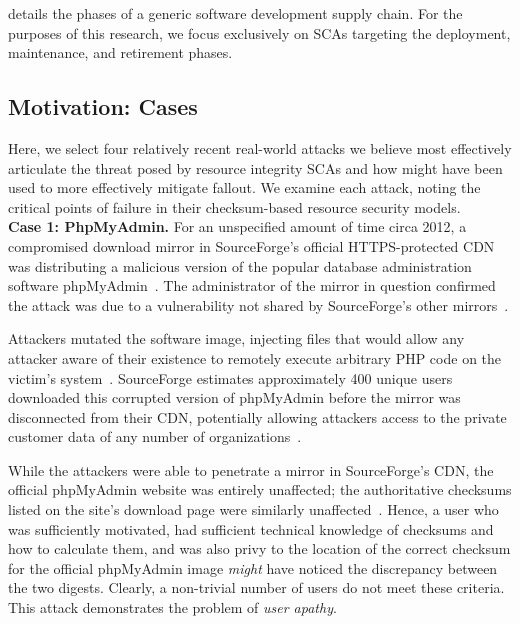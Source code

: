  details the phases of a generic software development supply
chain. For the purposes of this research, we focus exclusively on SCAs targeting
the deployment, maintenance, and retirement phases.

\subsection{Motivation: Cases}

Here, we select four relatively recent real-world attacks we believe most
effectively articulate the threat posed by resource integrity SCAs and how
\SYSTEM{} might have been used to more effectively mitigate fallout. We examine
each attack, noting the critical points of failure in their checksum-based
resource security models. \\

\noindent\textbf{Case 1: PhpMyAdmin.} For an unspecified amount of time circa
2012, a compromised download mirror in SourceForge's official HTTPS-protected
CDN was distributing a malicious version of the popular database administration
software phpMyAdmin~\cite{SCA-PMA3}. The administrator of the mirror in question
confirmed the attack was due to a vulnerability not shared by SourceForge's
other mirrors~\cite{SCA-PMA2}.

Attackers mutated the software image, injecting files that would allow any
attacker aware of their existence to remotely execute arbitrary PHP code on the
victim's system~\cite{SCA-PMA1}. SourceForge estimates approximately 400 unique
users downloaded this corrupted version of phpMyAdmin before the mirror was
disconnected from their CDN, potentially allowing attackers access to the
private customer data of any number of organizations~\cite{SCA-PMA2}.

While the attackers were able to penetrate a mirror in SourceForge's CDN, the
official phpMyAdmin website was entirely unaffected; the authoritative checksums
listed on the site's download page were similarly unaffected~\cite{SCA-PMA2}.
Hence, a user who was sufficiently motivated, had sufficient technical knowledge
of checksums and how to calculate them, and was also privy to the location of
the correct checksum for the official phpMyAdmin image \emph{might} have noticed
the discrepancy between the two digests. Clearly, a non-trivial number of users
do not meet these criteria. This attack demonstrates the problem of \emph{user
apathy}.\\


